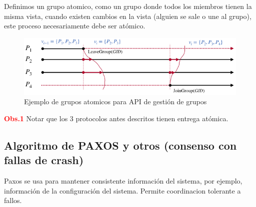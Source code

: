 Definimos un grupo atomico, como un grupo donde todos los miembros tienen la misma vista, cuando existen cambios en la vista (alguien se sale o une al grupo), este proceso necesariamente debe ser atómico.

\begin{figure}[H]
    \centering
    \includegraphics[width=1.0\linewidth]{img/Api_gestion.png}
    \caption{Ejemplo de grupos atomicos para API de gestión de grupos}\label{fig:1761676301300}
\end{figure}

\textcolor{red}{\textbf{Obs.1}} Notar que los 3 protocolos antes descritos tienen entrega atómica.


\subsection{Algoritmo de PAXOS y otros (consenso con fallas de crash)}

Paxos se usa para mantener consistente información del sistema, por ejemplo, información de la configuración del sistema. Permite coordinacion tolerante a fallos.

